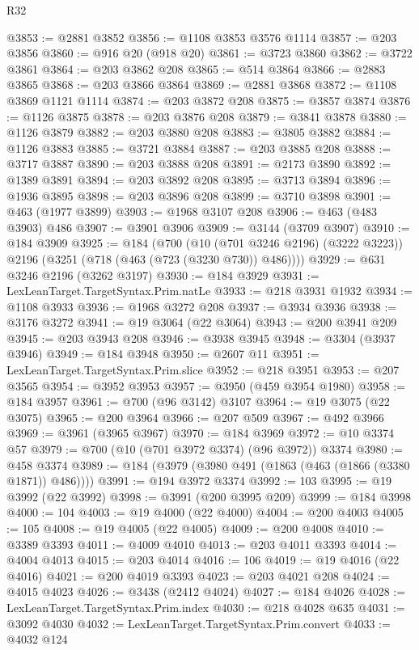\begin{lexlean}{R32}
\begin{coremodule}
@3853 := @2881 @3852
@3856 := @1108 @3853 @3576 @1114
@3857 := @203 @3856
@3860 := @916 @20 (@918 @20)
@3861 := @3723 @3860
@3862 := @3722 @3861
@3864 := @203 @3862 @208
@3865 := @514 @3864
@3866 := @2883 @3865
@3868 := @203 @3866 @3864
@3869 := @2881 @3868
@3872 := @1108 @3869 @1121 @1114
@3874 := @203 @3872 @208
@3875 := @3857 @3874
@3876 := @1126 @3875
@3878 := @203 @3876 @208
@3879 := @3841 @3878
@3880 := @1126 @3879
@3882 := @203 @3880 @208
@3883 := @3805 @3882
@3884 := @1126 @3883
@3885 := @3721 @3884
@3887 := @203 @3885 @208
@3888 := @3717 @3887
@3890 := @203 @3888 @208
@3891 := @2173 @3890
@3892 := @1389 @3891
@3894 := @203 @3892 @208
@3895 := @3713 @3894
@3896 := @1936 @3895
@3898 := @203 @3896 @208
@3899 := @3710 @3898
@3901 := @463 (@1977 @3899)
@3903 := @1968 @3107 @208
@3906 := @463 (@483 @3903) @486
@3907 := @3901 @3906
@3909 := @3144 (@3709 @3907)
@3910 := @184 @3909
@3925 := @184
    (@700
      (@10 (@701 @3246 @2196) (@3222 @3223))
      @2196
      (@3251 (@718 (@463 (@723 (@3230 @730)) @486))))
@3929 := @631 @3246 @2196 (@3262 @3197)
@3930 := @184 @3929
@3931 := LexLeanTarget.TargetSyntax.Prim.natLe
@3933 := @218 @3931 @1932
@3934 := @1108 @3933
@3936 := @1968 @3272 @208
@3937 := @3934 @3936
@3938 := @3176 @3272
@3941 := @19 @3064 (@22 @3064)
@3943 := @200 @3941 @209
@3945 := @203 @3943 @208
@3946 := @3938 @3945
@3948 := @3304 (@3937 @3946)
@3949 := @184 @3948
@3950 := @2607 @11
@3951 := LexLeanTarget.TargetSyntax.Prim.slice
@3952 := @218 @3951
@3953 := @207 @3565
@3954 := @3952 @3953
@3957 := @3950 (@459 @3954 @1980)
@3958 := @184 @3957
@3961 := @700 (@96 @3142) @3107
@3964 := @19 @3075 (@22 @3075)
@3965 := @200 @3964
@3966 := @207 @509
@3967 := @492 @3966
@3969 := @3961 (@3965 @3967)
@3970 := @184 @3969
@3972 := @10 @3374 @57
@3979 := @700 (@10 (@701 @3972 @3374) (@96 @3972)) @3374
@3980 := @458 @3374
@3989 := @184 (@3979 (@3980 @491 (@1863 (@463 (@1866 (@3380 @1871)) @486))))
@3991 := @194 @3972 @3374
@3992 := 103
@3995 := @19 @3992 (@22 @3992)
@3998 := @3991 (@200 @3995 @209)
@3999 := @184 @3998
@4000 := 104
@4003 := @19 @4000 (@22 @4000)
@4004 := @200 @4003
@4005 := 105
@4008 := @19 @4005 (@22 @4005)
@4009 := @200 @4008
@4010 := @3389 @3393
@4011 := @4009 @4010
@4013 := @203 @4011 @3393
@4014 := @4004 @4013
@4015 := @203 @4014
@4016 := 106
@4019 := @19 @4016 (@22 @4016)
@4021 := @200 @4019 @3393
@4023 := @203 @4021 @208
@4024 := @4015 @4023
@4026 := @3438 (@2412 @4024)
@4027 := @184 @4026
@4028 := LexLeanTarget.TargetSyntax.Prim.index
@4030 := @218 @4028 @635
@4031 := @3092 @4030
@4032 := LexLeanTarget.TargetSyntax.Prim.convert
@4033 := @4032 @124

\end{coremodule}
\end{lexlean}
